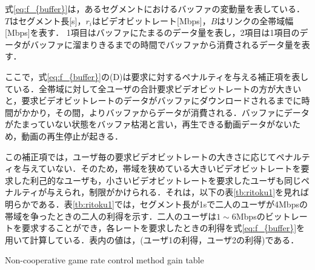 式\eqref{eq:f_{buffer}}は，あるセグメントにおけるバッファの変動量を表している．
$T$はセグメント長[s]，$r_i$はビデオビットレート[Mbps]，$B$はリンクの全帯域幅[Mbps]を表す．
1項目はバッファにたまるのデータ量を表し，2項目は1項目のデータがバッファに溜まりきるまでの時間でバッファから消費されるデータ量を表す．

ここで，式\eqref{eq:f_{buffer}}の(D)は要求に対するペナルティを与える補正項を表している．全帯域に対して全ユーザの合計要求ビデオビットレートの方が大きいと，要求ビデオビットレートのデータがバッファにダウンロードされるまでに時間がかかり，その間，よりバッファからデータが消費される．バッファにデータがたまっていない状態をバッファ枯渇と言い，再生できる動画データがないため，動画の再生停止が起きる．

この補正項では，ユーザ毎の要求ビデオビットレートの大きさに応じてペナルティを与えていない．そのため，帯域を狭めている大きいビデオビットレートを要求した利己的なユーザも，小さいビデオビットレートを要求したユーザも同じペナルティが与えられ，制限がかけられる．それは，以下の表\ref{tb:ritoku1}を見れば明らかである．表\ref{tb:ritoku1}では，セグメント長が1sで二人のユーザが4Mbpsの帯域を争ったときの二人の利得を示す．二人のユーザは$1\sim6$Mbpsのビットレートを要求することができ，各レートを要求したときの利得を式\eqref{eq:f_{buffer}}を用いて計算している．表内の値は，(ユーザ1の利得，ユーザ2の利得)である．

\begin{table}[h]
    \centering
            {Non-cooperative game rate control method\cite{motomoto} gain table}
    \label{tb:ritoku1}
\end{table}

